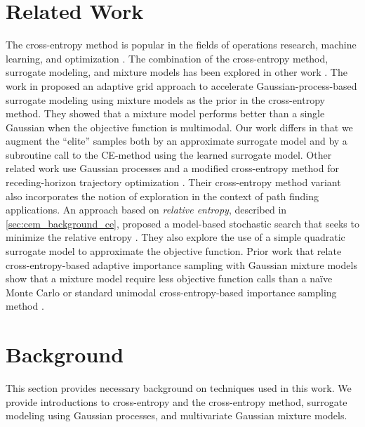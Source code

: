\section{Related Work} \label{sec:cem_related_work}
The cross-entropy method is popular in the fields of operations research, machine learning, and optimization \cite{kochenderfer2015decision,kochenderfer2019algorithms}.
The combination of the cross-entropy method, surrogate modeling, and mixture models has been explored in other work \cite{bardenet2010surrogating}. 
The work in \cite{bardenet2010surrogating} proposed an adaptive grid approach to accelerate Gaussian-process-based surrogate modeling using mixture models as the prior in the cross-entropy method. They showed that a mixture model performs better than a single Gaussian when the objective function is multimodal.
Our work differs in that we augment the ``elite'' samples both by an approximate surrogate model and by a subroutine call to the CE-method using the learned surrogate model.
Other related work use Gaussian processes and a modified cross-entropy method for receding-horizon trajectory optimization \cite{tan2018gaussian}.
Their cross-entropy method variant also incorporates the notion of exploration in the context of path finding applications.
An approach based on \textit{relative entropy}, described in \cref{sec:cem_background_ce}, proposed a model-based stochastic search that seeks to minimize the relative entropy \cite{NIPS2015_5672}. They also explore the use of a simple quadratic surrogate model to approximate the objective function.
Prior work that relate cross-entropy-based adaptive importance sampling with Gaussian mixture models show that a mixture model require less objective function calls than a na\"ive Monte Carlo or standard unimodal cross-entropy-based importance sampling method \cite{kurtz2013cross,wang2016cross}.


\section{Background} \label{sec:cem_background}
This section provides necessary background on techniques used in this work. We provide introductions to cross-entropy and the cross-entropy method, surrogate modeling using Gaussian processes, and multivariate Gaussian mixture models.


